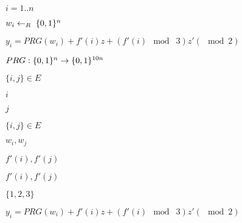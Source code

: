 \documentclass[10pt]{book}
\begin{document}
\begin{mdSnippets}
\begin{mdInlineSnippet}[9284220ad3b340f2b5cc5c20d995c906]
$i=1..n$\end{mdInlineSnippet}%
\begin{mdInlineSnippet}%
$w_i \leftarrow_R\; \{0,1\}^n$\end{mdInlineSnippet}%
\begin{mdInlineSnippet}[a3b48626cd7d9e0ddcecc07882e86e83]%
$y_i = PRG(w_i)+f'(i)z +(f'(i) \mod\; 3)z' (\mod 2)$\end{mdInlineSnippet}%
\begin{mdInlineSnippet}%
$PRG:\{0,1\}^n\rightarrow\{0,1\}^{10n}$\end{mdInlineSnippet}%
\begin{mdInlineSnippet}%
$\{i,j \} \in E$\end{mdInlineSnippet}%
\begin{mdInlineSnippet}[865c0c0b4ab0e063e5caa3387c1a8741]%
$i$\end{mdInlineSnippet}%
\begin{mdInlineSnippet}[363b122c528f54df4a0446b6bab05515]%
$j$\end{mdInlineSnippet}%
\begin{mdInlineSnippet}[321e8be9a994456a2d7febe17e8f51d5]%
$\{i,j\}\in E$\end{mdInlineSnippet}%
\begin{mdInlineSnippet}[9d66b5380a1702859617b42a06f59053]%
$w_i,w_j$\end{mdInlineSnippet}%
\begin{mdInlineSnippet}[c1a25628b4ffe5de632d3ed76c6a8c0f]%
$f'(i),f'(j)$\end{mdInlineSnippet}%
\begin{mdInlineSnippet}[c1a25628b4ffe5de632d3ed76c6a8c0f]%
$f'(i),f'(j)$\end{mdInlineSnippet}%
\begin{mdInlineSnippet}[1d4734bc6db8002e08e28eec76ab0b7a]%
$\{1,2,3\}$\end{mdInlineSnippet}%
\begin{mdInlineSnippet}[a3b48626cd7d9e0ddcecc07882e86e83]%
$y_i = PRG(w_i)+f'(i)z +(f'(i) \mod\; 3)z' (\mod 2)$\end{mdInlineSnippet}%
\begin{mdInlineSnippet}%

\end{mdInlineSnippet}
\end{mdSnippets}
\end{document}
